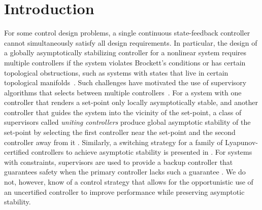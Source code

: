 \section{Introduction}
\label{sec:intro}
For some control design problems, 
a single continuous state-feedback controller 
cannot simultaneously satisfy all design requirements. 
In particular, the design of a globally asymptotically 
stabilizing controller for a nonlinear system
requires multiple controllers 
if the system violates Brockett's 
conditions \cite{brockett_asymptotic_1983} or
has certain topological obstructions,   
such as systems with states that live 
in certain topological manifolds~\cite{mayhew_quaternion-based_2011,sanfelice_robust_2006}.
Such challenges have motivated the use 
of supervisory algorithms that
selects between multiple 
controllers~\cite{liberzon_switching_2012,battistelli_supervisory_2012,hespanha_logic-based_1998,hespanha_supervision_1996}.
For a system with one controller that renders %
a set-point only locally asymptotically stable, 
and another controller that guides
the system into the vicinity of the set-point, 
a class of supervisors called \emph{uniting controllers}
produce global asymptotic stability of the set-point 
by selecting the first controller near the set-point 
and the second controller away from it
\cite{prieur_uniting_2001,sanfelice_hybrid_2021,teel_uniting_1997}.
Similarly, a switching strategy for a family of 
Lyapunov-certified controllers to achieve asymptotic stability 
is presented in \cite{el-farra_output_2005}.
For systems with constraints,
supervisors are used to
provide a backup controller that guarantees 
safety when the primary controller 
lacks such a guarantee \cite{seto_simplex_1998}.
We do not, however, know of a 
control strategy that allows for
the opportunistic use of an uncertified controller 
to improve performance while preserving asymptotic stability. 

